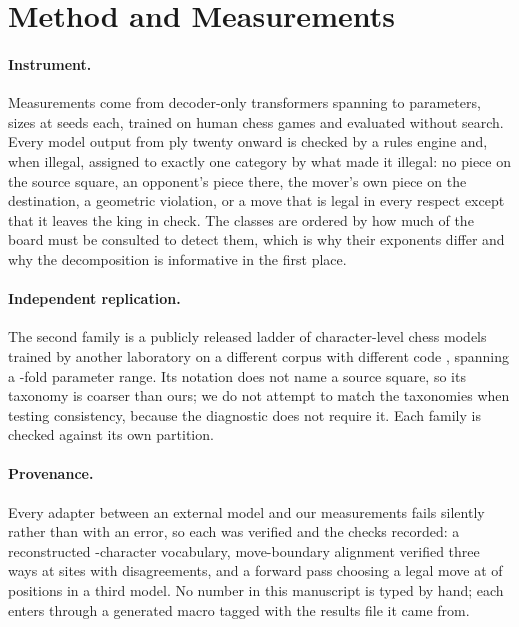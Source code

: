 \documentclass[11pt]{article}
\begin{document}
\section{Method and Measurements}
\label{sec:method}

\paragraph{Instrument.}
Measurements come from  decoder-only transformers spanning
 to  parameters,  sizes at
 seeds each, trained on human chess games and evaluated without
search. Every model output from ply twenty onward is checked by a rules engine and,
when illegal, assigned to exactly one category by what made it illegal: no piece on
the source square, an opponent's piece there, the mover's own piece on the
destination, a geometric violation, or a move that is legal in every respect except
that it leaves the king in check. The classes are ordered by how much of the board
must be consulted to detect them, which is why their exponents differ and why the
decomposition is informative in the first place.

\paragraph{Independent replication.}
The second family is a publicly released ladder of character-level chess models
trained by another laboratory on a different corpus with different code
\citep{karvonen2024emergent}, spanning a -fold parameter range. Its
notation does not name a source square, so its taxonomy is coarser than ours; we do
not attempt to match the taxonomies when testing consistency, because the
diagnostic does not require it. Each family is checked against its own partition.

\paragraph{Provenance.}
Every adapter between an external model and our measurements fails silently rather
than with an error, so each was verified and the checks recorded: a reconstructed
-character vocabulary, move-boundary alignment verified three ways
at  sites with  disagreements, and a
forward pass choosing a legal move at  of 
positions in a third model. No number in this manuscript is typed by hand; each
enters through a generated macro tagged with the results file it came from.
\end{document}
